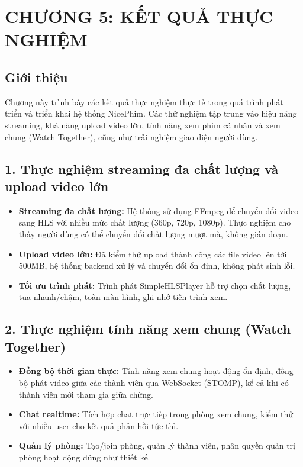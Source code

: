 
\newpage

\section{\textbf{CHƯƠNG 5: KẾT QUẢ THỰC NGHIỆM}}

\subsection{Giới thiệu}
Chương này trình bày các kết quả thực nghiệm thực tế trong quá trình phát triển và triển khai hệ thống NicePhim. Các thử nghiệm tập trung vào hiệu năng streaming, khả năng upload video lớn, tính năng xem phim cá nhân và xem chung (Watch Together), cũng như trải nghiệm giao diện người dùng.

\subsection{1. Thực nghiệm streaming đa chất lượng và upload video lớn}
\begin{itemize}
	\item \textbf{Streaming đa chất lượng:} Hệ thống sử dụng FFmpeg để chuyển đổi video sang HLS với nhiều mức chất lượng (360p, 720p, 1080p). Thực nghiệm cho thấy người dùng có thể chuyển đổi chất lượng mượt mà, không gián đoạn.
	\item \textbf{Upload video lớn:} Đã kiểm thử upload thành công các file video lên tới 500MB, hệ thống backend xử lý và chuyển đổi ổn định, không phát sinh lỗi.
	\item \textbf{Tối ưu trình phát:} Trình phát SimpleHLSPlayer hỗ trợ chọn chất lượng, tua nhanh/chậm, toàn màn hình, ghi nhớ tiến trình xem.
\end{itemize}

\subsection{2. Thực nghiệm tính năng xem chung (Watch Together)}
\begin{itemize}
	\item \textbf{Đồng bộ thời gian thực:} Tính năng xem chung hoạt động ổn định, đồng bộ phát video giữa các thành viên qua WebSocket (STOMP), kể cả khi có thành viên mới tham gia giữa chừng.
	\item \textbf{Chat realtime:} Tích hợp chat trực tiếp trong phòng xem chung, kiểm thử với nhiều user cho kết quả phản hồi tức thì.
	\item \textbf{Quản lý phòng:} Tạo/join phòng, quản lý thành viên, phân quyền quản trị phòng hoạt động đúng như thiết kế.
\end{itemize}

